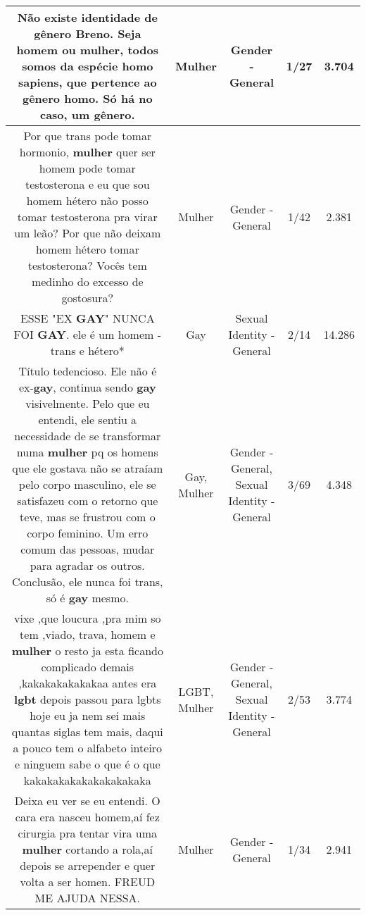 \documentclass[11pt]{article}
\newlength\mylength
\begin{document}
\begin{center}
\begin{longtable}{|C{.65\mylength}|C{.30\mylength}|C{.12\mylength}|C{.12\mylength}|C{.12\mylength}|}
  \small Não existe identidade de gênero Breno. Seja homem ou \textbf{mulher}, todos somos da espécie homo sapiens, que pertence ao gênero homo. Só há no caso, um gênero.\normalsize   & Mulher & Gender - General & 1/27 & 3.704 \\  \hline
  \small Por que trans pode tomar hormonio, \textbf{mulher} quer ser homem pode tomar testosterona e eu que sou homem hétero não posso tomar testosterona pra virar um leão? Por que não deixam homem hétero tomar testosterona? Vocês tem medinho do excesso de gostosura?\normalsize   & Mulher & Gender - General & 1/42 & 2.381 \\  \hline
  \small *ESSE "EX \textbf{GAY}" NUNCA FOI \textbf{GAY}. ele é um homem - trans e hétero*\normalsize   & Gay & Sexual Identity - General & 2/14 & 14.286 \\  \hline
  \small Título tedencioso. Ele não é ex-\textbf{gay}, continua sendo \textbf{gay} visivelmente. Pelo que eu entendi, ele sentiu a necessidade de se transformar numa \textbf{mulher} pq os homens que ele gostava não se atraíam pelo corpo masculino, ele se satisfazeu com o retorno que teve, mas se frustrou com o corpo feminino. Um erro comum das pessoas, mudar para agradar os outros. Conclusão, ele nunca foi trans, só é \textbf{gay} mesmo.\normalsize   & Gay, Mulher & Gender - General, Sexual Identity - General & 3/69 & 4.348 \\  \hline
  \small vixe  ,que loucura  ,pra  mim so tem ,viado, trava,  homem e \textbf{mulher}  o resto  ja  esta  ficando complicado demais  ,kakakakakakakaa  antes era \textbf{lgbt}  depois  passou para  lgbts hoje eu ja nem sei mais quantas  siglas  tem mais, daqui a  pouco tem o alfabeto inteiro  e  ninguem  sabe  o que  é  o que  kakakakakakakakakakaka\normalsize   & LGBT, Mulher & Gender - General, Sexual Identity - General & 2/53 & 3.774 \\  \hline
  \small Deixa eu ver se eu entendi. O cara era nasceu homem,aí fez cirurgia pra tentar vira uma \textbf{mulher} cortando a rola,aí depois se arrepender e quer volta a ser homen. FREUD ME AJUDA NESSA.\normalsize   & Mulher & Gender - General & 1/34 & 2.941 \\  \hline

\end{longtable}
\end{center}
\end{document}
